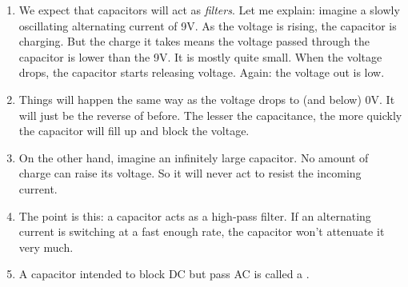\documentclass[11pt, oneside]{amsart}
\begin{document}
\begin{enumerate}

  \item We expect that capacitors will act as \emph{filters}. Let me
  explain: imagine a slowly oscillating alternating current of 9V. As
  the voltage is rising, the capacitor is charging. But the charge it
  takes means the voltage passed through the capacitor is lower than the
  9V. It is mostly quite small. When the voltage drops, the capacitor
  starts releasing voltage. Again: the voltage out is low.

  \item Things will happen the same way as the voltage drops to (and
  below) 0V. It will just be the reverse of before. The lesser the
  capacitance, the more quickly the capacitor will fill up and block the
  voltage.

  \item On the other hand, imagine an infinitely large capacitor. No
  amount of charge can raise its voltage. So it will never act to resist
  the incoming current.

  \item The point is this: a capacitor acts as a high-pass filter. If an
  alternating current is switching at a fast enough rate, the capacitor
  won't attenuate it very much.

  \item A capacitor intended to block DC but pass AC is called a
  .

\end{enumerate}
\end{document}
